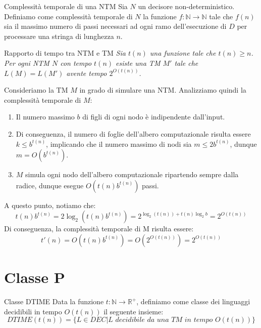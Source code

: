 \begin{Definition}{Complessità temporale di una NTM}{}
Sia $N$ un decisore non-deterministico. Definiamo come complessità temporale di $N$
la funzione $f : \mathbb{N}\to \mathbb{N}$ tale che $f(n)$ sia il massimo numero di passi necessari ad ogni ramo dell’esecuzione di $D$ per processare una stringa di lunghezza $n$.
\end{Definition}

\begin{Example}{Rapporto di tempo tra NTM e TM}{}
\textit{Sia $t(n)$ una funzione tale che $t(n) \geq n$. Per ogni NTM $N$ con tempo $t(n)$ esiste una
TM $M'$ tale che $L(M) = L(M')$ avente tempo $2^{O(t(n))}$.}

Consideriamo la TM $M$ in grado di simulare una NTM. Analizziamo quindi la complessità temporale di $M$:
\begin{enumerate}
    \item Il numero massimo $b$ di figli di ogni nodo è indipendente dall’input.
    \item Di conseguenza, il numero di foglie dell’albero computazionale risulta essere $k \leq b^{t(n)}$, implicando che il numero massimo di nodi sia $m\leq 2b^{t(n)}$, dunque $m = O(b^{t(n)})$.
    \item $M$ simula ogni nodo dell’albero computazionale ripartendo sempre dalla radice, dunque esegue $O(t(n)b^{t(n)})$ passi.
\end{enumerate}
A questo punto, notiamo che:
\begin{equation*}
t(n)b^{t(n)} = 2{\log_2(t(n)b^{t(n)})} = 2^{\log_2(t(n))+t(n)\log_2b} = 2^{O(t(n))}
\end{equation*}
Di conseguenza, la complessità temporale di M risulta essere:
\begin{equation*}
t'(n) = O(t(n)b^{t(n)}) = O(2^{O(t(n))}) = 2^{O(t(n))}
\end{equation*}
\end{Example}

\section{Classe P}
\begin{Definition}{Classe DTIME}{}
Data la funzione $t :\mathbb{N}\to \mathbb{R}^+$, definiamo come classe dei linguaggi decidibili in tempo $O(t(n))$ il seguente insieme:
\begin{equation*}
    DTIME(t(n)) = \{L\in DEC | L\textit{ decidibile da una }TM\textit{ in tempo }O(t(n))\}
\end{equation*}
\end{Definition}

